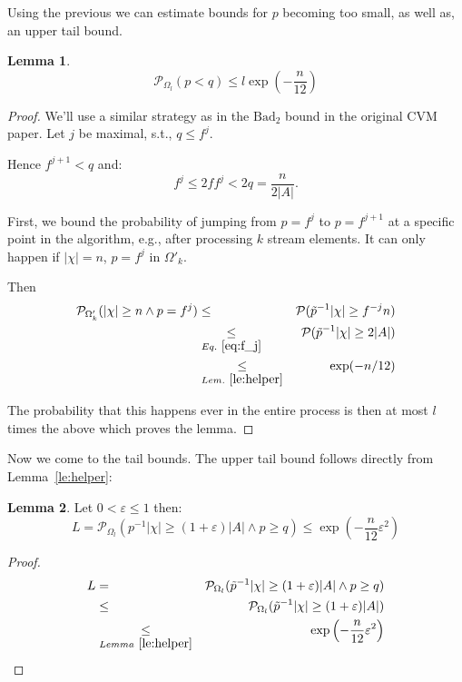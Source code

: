 \documentclass{article}
\newcommand{\prob}{\mathcal P}
\newcommand{\eps}{\varepsilon}
\theoremstyle{definition}
\newtheorem{lemma}{Lemma}
\begin{document}
Using the previous we can estimate bounds for $p$ becoming too small, as well as, an upper tail bound.
\begin{lemma}\label{le:low_p}
\[
\prob_{\Omega_l}(p < q) \leq l \exp\left( - \frac{n}{12}\right)
\]
\end{lemma}
\begin{proof}
We'll use a similar strategy as in the $\mathrm{Bad}_2$ bound in the original CVM paper.
Let $j$ be maximal, s.t., $q \leq f^j$.

Hence $f^{j+1} < q$ and:
\begin{equation}
\label{eq:f_j}
  f^j \leq 2f f^j < 2q = \frac{n}{2|A|} \textrm{.}
\end{equation}

First, we bound the probability of jumping from $p=f^j$ to $p=f^{j+1}$ at a specific point in the algorithm, e.g., after processing $k$ stream elements.
It can only happen if $|\chi|=n$, $p=f^j$ in $\Omega'_k$.

Then
\begin{eqnarray*}
  \prob_{\Omega'_k} ( |\chi| \geq n \wedge p=f^j) & \leq & \prob( \tilde{p}^{-1} |\chi| \geq f^{-j} n ) \\
    & \underset{Eq.~\ref{eq:f_j}}{\leq} & \prob( \tilde{p}^{-1} |\chi| \geq 2|A| ) \\
    & \underset{Lem.~\ref{le:helper}}{\leq} & \exp( - n/12)
\end{eqnarray*}

The probability that this happens ever in the entire process is then at most $l$ times the above which proves the lemma.
\end{proof}

Now we come to the tail bounds. The upper tail bound follows directly from Lemma~\ref{le:helper}:
\begin{lemma}\label{le:upper_tail}
Let $0 < \eps \leq 1$ then:
\[
  L = \prob_{\Omega_l} ( p^{-1} |\chi| \geq (1+\eps)|A| \wedge p \geq q) \leq \exp\left(-\frac{n}{12} \eps^2\right)
\]
\end{lemma}
\begin{proof}
\begin{eqnarray*}
  L & =&  \prob_{\Omega_l} ( \tilde{p}^{-1} |\chi| \geq (1+\eps)|A| \wedge p \geq q) \\
  & \leq & \prob_{\Omega_l} ( \tilde{p}^{-1} |\chi| \geq (1+\eps)|A| ) \\
  & \underset{Lemma~\ref{le:helper}}{\leq}  &  \exp\left(-\frac{n}{12} \eps^2\right)
\end{eqnarray*}
\end{proof}
\end{document}
